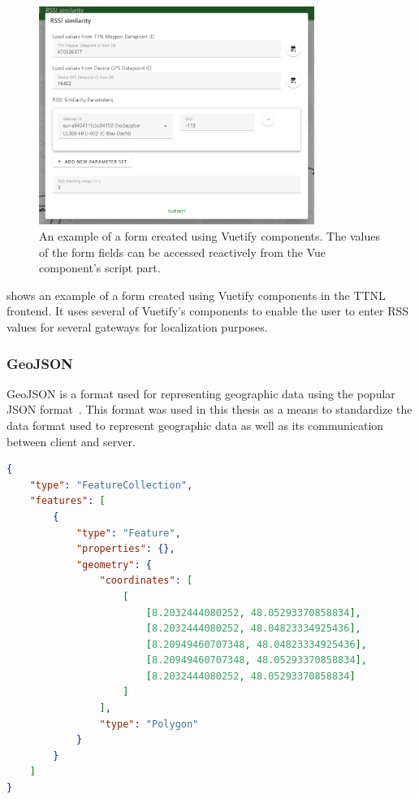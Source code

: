 \begin{figure}[htbp]
    \centering
    \includegraphics[width=0.8\textwidth]{pictures/ttn-locator/frontend/vuetify-form-example.png}
    \caption{
        An example of a form created using Vuetify components.
        The values of the form fields can be accessed reactively from the Vue component's script part.
    }\label{fig:vuetify-form-example}
\end{figure}

 shows an example of a form created using Vuetify components in the \ac{TTNL} frontend.
It uses several of Vuetify's components to enable the user to enter \ac{RSS} values for several gateways for localization purposes.

\subsubsection{GeoJSON}\label{sec:geojson}

GeoJSON is a format used for representing geographic data using the popular \ac{JSON} format~\cite{butler_geojson_2016}.
This format was used in this thesis as a means to standardize the data format used to represent geographic data as well as its communication between client and server.

\begin{lstlisting}[language=JSON, float, caption={Example of a GeoJSON that represents a rectangle above the furtwangen city center}, label={lst:geojson-example}]
{
    "type": "FeatureCollection",
    "features": [
        {
            "type": "Feature",
            "properties": {},
            "geometry": {
                "coordinates": [
                    [
                        [8.2032444080252, 48.05293370858834],
                        [8.2032444080252, 48.04823334925436],
                        [8.20949460707348, 48.04823334925436],
                        [8.20949460707348, 48.05293370858834],
                        [8.2032444080252, 48.05293370858834]
                    ]
                ],
                "type": "Polygon"
            }
        }
    ]
}  
\end{lstlisting}

